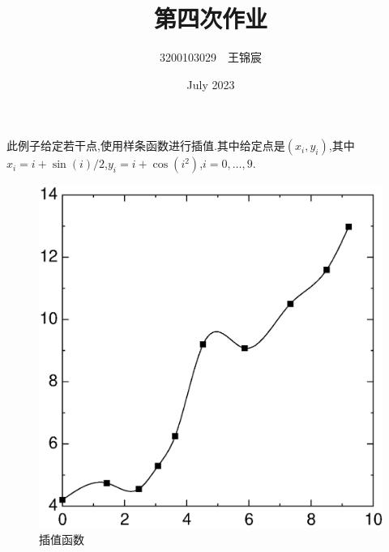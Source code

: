 \documentclass[UTF8]{ctexart}
\title{第四次作业}
\author{3200103029　王锦宸}
\date{July 2023}
\begin{document}
\maketitle

此例子给定若干点,使用样条函数进行插值.其中给定点是$(x_i,y_i)$,其中$x_i=i+\sin(i)/2$,$y_i=i+\cos(i^2)$,$i=0,\ldots,9$.
\begin{figure}[h]
    \centering
    \includegraphics[scale=0.5]{interp.eps}
    \caption{插值函数}
    \label{fig:enter-label}
\end{figure}
\end{document}
